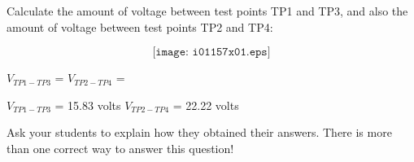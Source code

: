 

Calculate the amount of voltage between test points TP1 and TP3, and also the amount of voltage between test points TP2 and TP4:

$$\texttt{[image: i01157x01.eps]}$$

$V_{TP1-TP3}$ = \hskip 40pt $V_{TP2-TP4}$ = 

\vskip 10pt







$V_{TP1-TP3}$ = 15.83 volts \hskip 20pt $V_{TP2-TP4}$ = 22.22 volts







Ask your students to explain how they obtained their answers.  There is more than one correct way to answer this question!




